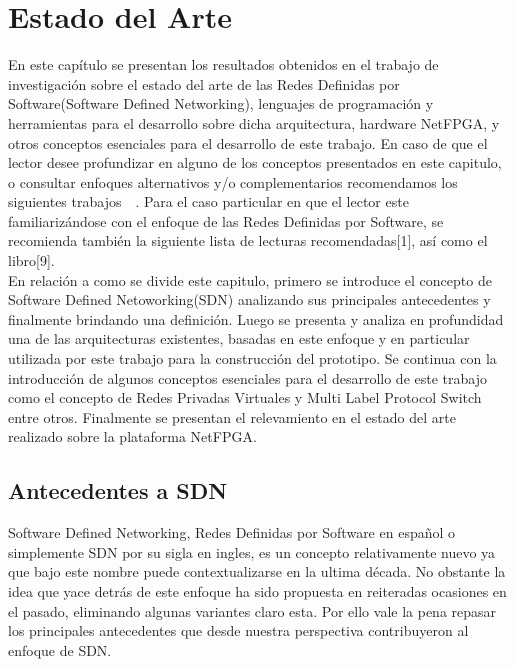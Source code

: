 
\chapter{Estado del Arte}  %

\ifpdf
    \graphicspath{{Chapter2/Figs/Raster/}{Chapter2/Figs/PDF/}{Chapter2/Figs/}}
\else
    \graphicspath{{Chapter2/Figs/Vector/}{Chapter2/Figs/}}
\fi

En este capítulo se presentan los resultados obtenidos en el trabajo de investigación sobre el estado
del arte de las Redes Definidas por Software(Software Defined Networking), lenguajes
de programación y herramientas para el desarrollo sobre dicha arquitectura, hardware NetFPGA, y otros conceptos esenciales para el desarrollo de este trabajo. En caso de que el lector desee profundizar en alguno de los conceptos presentados en este capitulo, o consultar enfoques alternativos
y/o complementarios recomendamos los siguientes trabajos~\citep{StateOfArt1}~\citep{StateOfArt2}. Para el caso particular en que el lector este familiarizándose con el enfoque de las Redes Definidas por Software, se recomienda también 
la siguiente lista de lecturas recomendadas[1], así como el libro[9].\\

En relación a como se divide este capitulo, primero se introduce el concepto de Software Defined Netoworking(SDN) analizando sus principales antecedentes y finalmente brindando una definición. Luego se presenta y analiza en profundidad una de las arquitecturas existentes, basadas en este enfoque y en particular utilizada por este trabajo para la construcción del prototipo. Se continua con la introducción de algunos conceptos esenciales para el desarrollo de este trabajo como el concepto de Redes Privadas Virtuales y Multi Label Protocol Switch entre otros. Finalmente se presentan el relevamiento en el estado del arte realizado sobre la plataforma NetFPGA.  

\section{Antecedentes a SDN} %
Software Defined Networking, Redes Definidas por Software en español o simplemente SDN por su sigla en ingles, es un concepto relativamente nuevo ya que bajo este nombre puede contextualizarse en la ultima década. No obstante la idea que yace detrás de este enfoque ha sido propuesta en reiteradas ocasiones en el pasado, eliminando algunas variantes claro esta. Por ello vale la pena repasar los principales antecedentes que desde nuestra perspectiva contribuyeron al enfoque de SDN. 


